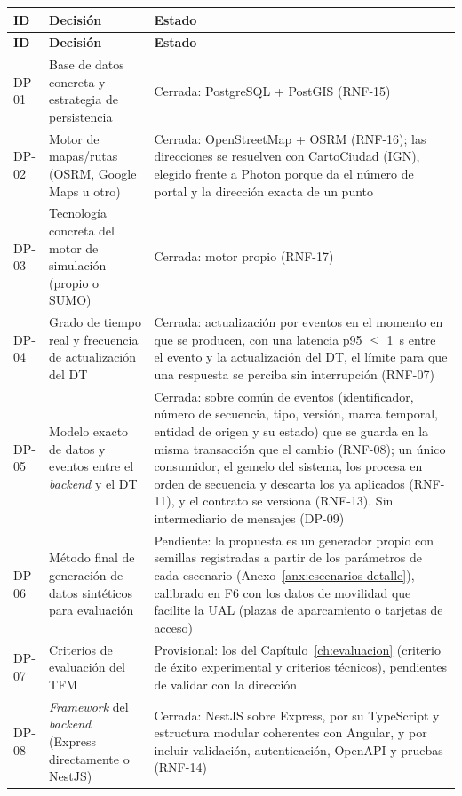 \begin{longtable}{@{}>{\raggedright\arraybackslash}p{1.30cm} >{\raggedright\arraybackslash}p{5.90cm} >{\raggedright\arraybackslash}p{7.20cm}@{}}
    \hline
    \textbf{ID} & \textbf{Decisión} & \textbf{Estado} \\
    \hline
    \endfirsthead
    \hline
    \textbf{ID} & \textbf{Decisión} & \textbf{Estado} \\
    \hline
    \endhead
    DP-01 & Base de datos concreta y estrategia de persistencia & Cerrada: PostgreSQL + PostGIS (RNF-15) \\
    DP-02 & Motor de mapas/rutas (OSRM, Google Maps u otro) & Cerrada: OpenStreetMap + OSRM (RNF-16); las direcciones se resuelven con CartoCiudad (IGN), elegido frente a Photon porque da el número de portal y la dirección exacta de un punto \\
    DP-03 & Tecnología concreta del motor de simulación (propio o SUMO) & Cerrada: motor propio (RNF-17) \\
    DP-04 & Grado de tiempo real y frecuencia de actualización del DT & Cerrada: actualización por eventos en el momento en que se producen, con una latencia p95 $\leq$ 1~s entre el evento y la actualización del DT, el límite para que una respuesta se perciba sin interrupción \cite{Nielsen1993} (RNF-07) \\
    DP-05 & Modelo exacto de datos y eventos entre el \textit{backend} y el DT & Cerrada: sobre común de eventos (identificador, número de secuencia, tipo, versión, marca temporal, entidad de origen y su estado) que se guarda en la misma transacción que el cambio (RNF-08); un único consumidor, el gemelo del sistema, los procesa en orden de secuencia y descarta los ya aplicados (RNF-11), y el contrato se versiona (RNF-13). Sin intermediario de mensajes (DP-09) \\
    DP-06 & Método final de generación de datos sintéticos para evaluación & Pendiente: la propuesta es un generador propio con semillas registradas a partir de los parámetros de cada escenario (Anexo~\ref{anx:escenarios-detalle}), calibrado en F6 con los datos de movilidad que facilite la UAL (plazas de aparcamiento o tarjetas de acceso) \\
    DP-07 & Criterios de evaluación del TFM & Provisional: los del Capítulo~\ref{ch:evaluacion} (criterio de éxito experimental y criterios técnicos), pendientes de validar con la dirección \\
    DP-08 & \textit{Framework} del \textit{backend} (Express directamente o NestJS) & Cerrada: NestJS sobre Express, por su TypeScript y estructura modular coherentes con Angular, y por incluir validación, autenticación, OpenAPI y pruebas (RNF-14) \\

\end{longtable}

